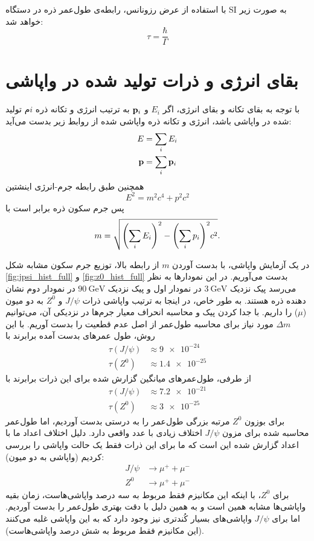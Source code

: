 \documentclass[12pt,a4paper]{article}
\begin{document}
	با استفاده از عرض رزونانس، رابطه‌ی طول‌عمر ذره در دستگاه SI به صورت زیر خواهد شد:
	\begin{equation}
		\tau=\frac{\hbar}{\Gamma}
	\end{equation}

	\section{بقای انرژی و ذرات تولید شده در واپاشی}
	با توجه به بقای تکانه و بقای انرژی، اگر $E_i$ و $\vb{p}_i$ به ترتیب انرژی و تکانه ذره $i$م تولید شده در واپاشی باشد، انرژی و تکانه ذره واپاشی شده از
	روابط زیر بدست می‌آید:
	\begin{align}
		E &= \sum_i E_i \\
		\vb{p} &= \sum_i \vb{p}_i
	\end{align}
	همچنین طبق رابطه جرم-انرژی اینشتین
	\begin{equation}
		E^2 = m^2c^4 + p^2c^2
	\end{equation}
	پس جرم سکون ذره برابر است با
	\begin{equation}
		m = \sqrt{\qty(\sum_i E_i)^2 - \qty(\sum_i p_i)^2c^2}.
	\end{equation}

	در یک آزمایش واپاشی، با بدست آوردن $m$ از رابطه بالا، توزیع جرم سکون مشابه شکل \ref{fig:jpsi_hist_full} و \ref{fig:z0_hist_full} بدست می‌آوریم. در این
	نمودارها به نظر می‌رسد پیک نزدیک $\SI{3}{\giga\electronvolt}$ در نمودار اول و پیک نزدیک $\SI{90}{\giga\electronvolt}$ در نمودار دوم نشان دهنده ذره هستند.
	به طور خاص، در اینجا به ترتیب واپاشی ذرات $J/\psi$ و $Z^0$ به دو میون ($\mu$) را داریم. با جدا کردن پیک و محاسبه انحراف معیار جرم‌ها در نزدیکی آن،
	می‌توانیم $\Delta{m}$ مورد نیاز برای محاسبه طول‌عمر از اصل عدم قطعیت را بدست آوریم. با این روش، طول عمرهای بدست آمده برابرند با
	\begin{align}
		\tau(J/\psi) &\approx \num{9e-24}  \\
		\tau(Z^0) &\approx \num{1.4e-25}
	\end{align}
	از طرفی، طول‌عمرهای میانگین گزارش شده برای این ذرات برابرند با
	\begin{align}
		\tau(J/\psi) &\approx \num{7.2e-21}  \\
		\tau(Z^0) &\approx \num{3e-25}
	\end{align}
	برای بوزون $Z^0 $ مرتبه بزرگی طول‌عمر را به درستی بدست آوردیم، اما طول‌عمر محاسبه شده برای مزون $J/\psi$ اختلاف زیادی با عدد واقعی دارد. دلیل اختلاف
	اعداد ما با اعداد گزارش شده این است که ما برای این ذرات فقط یک حالت واپاشی را بررسی کردیم (واپاشی به دو میون):
	\begin{align}
		J/\psi &\longrightarrow \mu^{+} + \mu^{-} \\
		Z^0 &\longrightarrow \mu^{+} + \mu^{-}
	\end{align}
	برای $Z^0 $، با اینکه این مکانیزم فقط مربوط به سه درصد واپاشی‌هاست، زمان بقیه واپاشی‌ها مشابه همین است و به همین دلیل با دقت بهتری طول‌عمر را بدست آوردیم.
	اما برای $J/\psi$ واپاشی‌های بسیار کُندتری نیز وجود دارد که به این واپاشی غلبه می‌کنند (این مکانیزم فقط مربوط به شش درصد واپاشی‌هاست).
	
\end{document}
